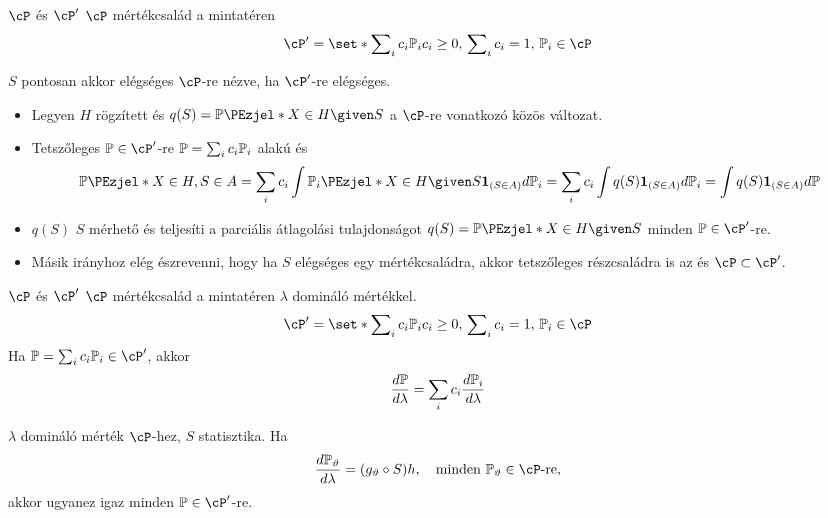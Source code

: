 \documentclass[aspectratio=169,notheorems,9pt,\option]{beamer}
\begin{document}
\begin{frame}{$\cP$ és $\cP'$}
$\cP$ mértékcsalád a mintatéren
\begin{displaymath}
  \cP'=\set*{\sum\nolimits_i c_i\P[i]}{c_i\geq0,\,\sum\nolimits_i c_i=1,\,\P[i]\in\cP}  
\end{displaymath}
\begin{proposition}
  $S$ pontosan akkor elégséges $\cP$-re nézve, ha $\cP'$-re elégséges.
\end{proposition}
\begin{itemize}
  \item Legyen $H$ rögzített és $q(S)=\P{X\in H\given S}$ a $\cP$-re vonatkozó közös változat. 
  \item Tetszőleges $\P\in\cP'$-re $\P=\sum_{i } c_i\P[i]$ alakú és 
  \begin{displaymath}
    \P{X\in H, S\in A}
    =\sum_{i} c_i\int \P[i]{X\in H\given S}\I{S\in A}d\P[i]
    =\sum_i c_i\int q(S) \I{S\in A}d\P[i]
    =\int q(S)\I{S\in A}d\P
  \end{displaymath} 
  \item $q(S)$ $S$ mérhető és teljesíti a parciális átlagolási tulajdonságot $q(S)=\P{X\in H\given S}$
  minden $\P\in\cP'$-re.
  \item Másik irányhoz elég észrevenni, hogy ha $S$ elégséges egy mértékcsaládra, 
  akkor tetszőleges részcsaládra is az és $\cP\subset\cP'$.
\end{itemize}
\end{frame}

\begin{frame}{$\cP$ és $\cP'$}
$\cP$ %
mértékcsalád a mintatéren $\lambda$ domináló mértékkel.
\begin{displaymath}
  \cP'=\set*{\sum\nolimits_i c_i\P[i]}{c_i\geq0,\,\sum\nolimits_i c_i=1,\,\P[i]\in\cP}  
\end{displaymath}
Ha $\P=\sum_i c_i\P[i]\in\cP'$, akkor
\begin{displaymath}
  \frac{d\P}{d\lambda} = \sum_{i} c_i\frac{d\P[i]}{d\lambda}
\end{displaymath}

\begin{proposition}
  $\lambda $ domináló mérték $\cP$-hez, $S$ statisztika. Ha
  \begin{displaymath}
    \frac{d\P[\theta]}{d\lambda}=(g_{\theta}\circ S)h,\quad \text{minden $\P[\theta]\in\cP$-re},
  \end{displaymath} 
  akkor ugyanez igaz minden $\P\in\cP'$-re.
\end{proposition}
\end{frame}
\end{document}
